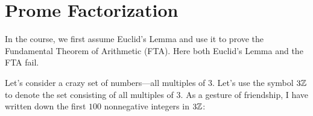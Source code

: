 \newpage
\section{Prome Factorization}\label{A:Prome}

%
%
%
%
%
%
%


\begin{teachingnote}
In the course, we first assume Euclid's Lemma and use it to prove the Fundamental Theorem of Arithmetic (FTA).  Here both Euclid's Lemma and the FTA fail.
\end{teachingnote}

Let's consider a crazy set of numbers---all multiples of $3$. Let's
use the symbol $3\mathbb Z$ to denote the set consisting of all multiples of
$3$. As a gesture of friendship, I have written down the first $100$
nonnegative integers in $3\mathbb Z$:

